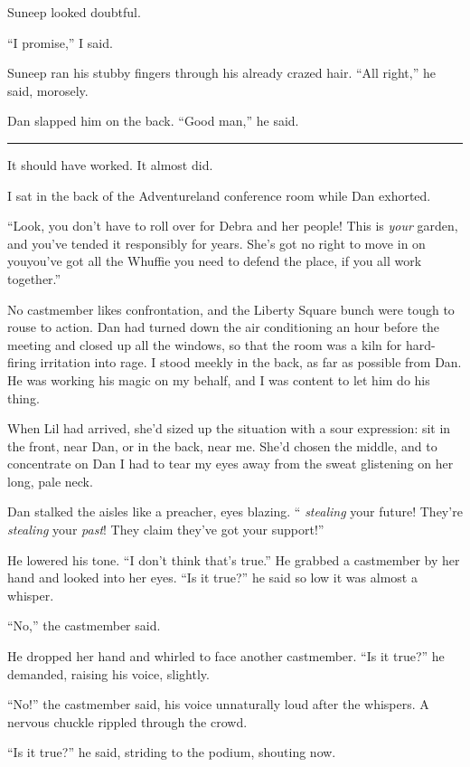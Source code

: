 Suneep looked doubtful.

“I promise,” I said.

Suneep ran his stubby fingers through his already crazed hair. “All
right,” he said, morosely.

Dan slapped him on the back. “Good man,” he said.

\begin{center}\rule{1in}{0.4pt}\end{center}

It should have worked. It almost did.

I sat in the back of the Adventureland conference room while Dan
exhorted.

“Look, you don't have to roll over for Debra and her people! This
is \emph{your} garden, and you've tended it responsibly for years.
She's got no right to move in on you{\dash}you've got all the Whuffie you
need to defend the place, if you all work together.”

No castmember likes confrontation, and the Liberty Square bunch
were tough to rouse to action. Dan had turned down the air
conditioning an hour before the meeting and closed up all the
windows, so that the room was a kiln for hard-firing irritation
into rage. I stood meekly in the back, as far as possible from Dan.
He was working his magic on my behalf, and I was content to let him
do his thing.

When Lil had arrived, she'd sized up the situation with a sour
expression: sit in the front, near Dan, or in the back, near me.
She'd chosen the middle, and to concentrate on Dan I had to tear my
eyes away from the sweat glistening on her long, pale neck.

Dan stalked the aisles like a preacher, eyes blazing. 
“
\emph{stealing} your future! They're \emph{stealing} your
\emph{past}! They claim they've got your support!”

He lowered his tone. “I don't think that's true.” He grabbed a
castmember by her hand and looked into her eyes. “Is it true?” he
said so low it was almost a whisper.

“No,” the castmember said.

He dropped her hand and whirled to face another castmember. “Is it
true?” he demanded, raising his voice, slightly.

“No!” the castmember said, his voice unnaturally loud after the
whispers. A nervous chuckle rippled through the crowd.

“Is it true?” he said, striding to the podium, shouting now.

